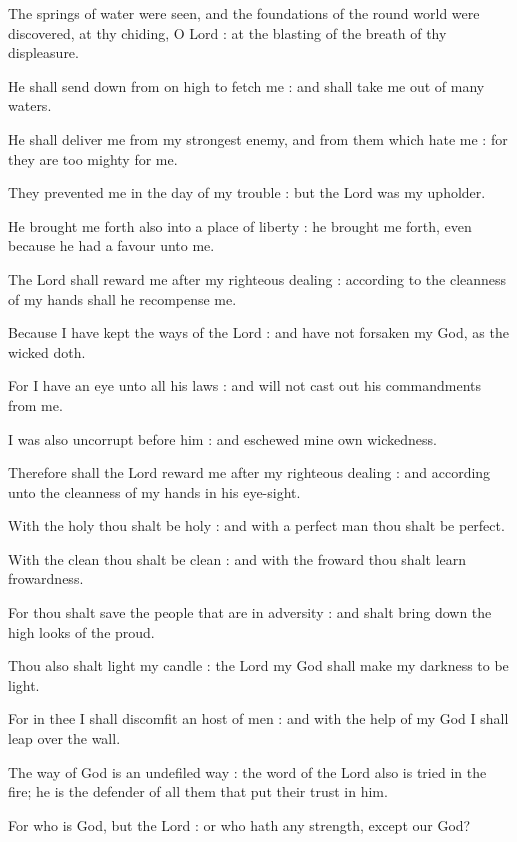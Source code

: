 The springs of water were seen, and the foundations of the round world were discovered, at thy chiding, O Lord : at the blasting of the breath of thy displeasure.\par
{}He shall send down from on high to fetch me : and shall take me out of many waters.\par
{}He shall deliver me from my strongest enemy, and from them which hate me : for they are too mighty for me.\par
{}They prevented me in the day of my trouble : but the Lord was my upholder.\par
{}He brought me forth also into a place of liberty : he brought me forth, even because he had a favour unto me.\par
{}The Lord shall reward me after my righteous dealing : according to the cleanness of my hands shall he recompense me.\par
{}Because I have kept the ways of the Lord : and have not forsaken my God, as the wicked doth.\par
{}For I have an eye unto all his laws : and will not cast out his commandments from me.\par
{}I was also uncorrupt before him : and eschewed mine own wickedness.\par
{}Therefore shall the Lord reward me after my righteous dealing : and according unto the cleanness of my hands in his eye-sight.\par
{}With the holy thou shalt be holy : and with a perfect man thou shalt be perfect.\par
{}With the clean thou shalt be clean : and with the froward thou shalt learn frowardness.\par
{}For thou shalt save the people that are in adversity : and shalt bring down the high looks of the proud.\par
{}Thou also shalt light my candle : the Lord my God shall make my darkness to be light.\par
{}For in thee I shall discomfit an host of men : and with the help of my God I shall leap over the wall.\par
{}The way of God is an undefiled way : the word of the Lord also is tried in the fire; he is the defender of all them that put their trust in him.\par
{}For who is God, but the Lord : or who hath any strength, except our God?\par
